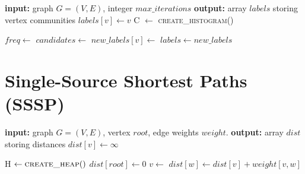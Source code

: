 \begin{algorithm}[h!]
\begin{algorithmic}[1]
\Statex \textbf{input:} graph $G=(V,E)$, integer $max\_iterations$
\Statex \textbf{output:} array $labels$ storing vertex communities
  \State $labels[v] \gets v$  
\EndFor
{}
  \State C $\gets$ \textsc{create\_histogram()}

    \State {}
  \EndFor
    \State {}
  \EndFor
  \State $freq \gets $ 
  \State $candidates \gets$ 
  \State $new\_labels[v] \gets$ 
 \EndFor
 \State ${labels} \gets {new\_labels}$
\EndFor
\end{algorithmic}
\end{algorithm}



\section{Single-Source Shortest Paths (SSSP)}

\begin{algorithm}[h!]
\begin{algorithmic}[1]
\Statex \textbf{input:} graph $G=(V,E)$, vertex $root$, edge weights $weight$.
\Statex \textbf{output:} array $dist$ storing distances
  \State ${dist}[v] \gets \infty$
\EndFor

\State H $\gets \Call{create\_heap}{ }$
\State {}
\State ${dist}[root] \gets 0$
  \State $v \gets$ 
      \State ${dist}[w] \gets {dist}[v] + {weight}[v,w]$
      \State {}
    \EndIf
  \EndFor
\EndWhile
\end{algorithmic}
\end{algorithm}
